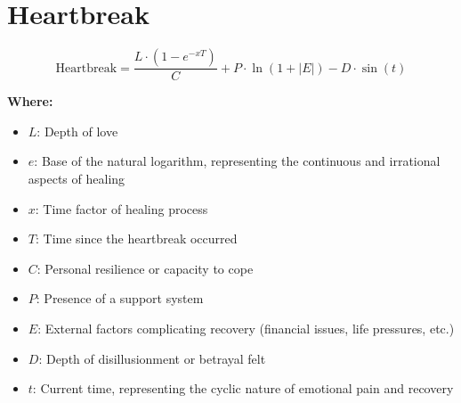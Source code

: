 \chapter{Heartbreak}

\begin{equation}
\text{Heartbreak} = \frac{L \cdot (1-e^{-xT})}{C} + P \cdot \ln{(1 + |E|)} - D\cdot \sin{(t)}
\end{equation}

\textbf{Where:}

\begin{itemize}
    \item $L$: Depth of love
    \item $e$: Base of the natural logarithm, representing the continuous and irrational aspects of healing
    \item $x$: Time factor of healing process
    \item $T$: Time since the heartbreak occurred
    \item $C$: Personal resilience or capacity to cope
    \item $P$: Presence of a support system
    \item $E$: External factors complicating recovery (financial issues, life pressures, etc.)
    \item $D$: Depth of disillusionment or betrayal felt
    \item $t$: Current time, representing the cyclic nature of emotional pain and recovery
\end{itemize}